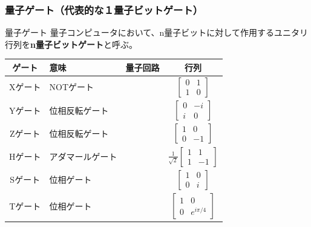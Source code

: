 \documentclass[9pt]{beamer}
\begin{document}
\begin{frame}
  \frametitle{量子ゲート（代表的な１量子ビットゲート）}
  \begin{block}{量子ゲート}
      量子コンピュータにおいて、n量子ビットに対して作用するユニタリ行列を\textbf{n量子ビットゲート}と呼ぶ。
  \end{block}
  \begin{table}[]
    \centering
    \footnotesize
    \begin{tabular}{|c|>{\centering\arraybackslash}p{5em}|c|c|} \hline
      ゲート & 意味 & 量子回路 & 行列 \\ \hline
      Xゲート & NOTゲート & \hspace{5em} \rule{0pt}{2em} & $\begin{bmatrix}0 & 1 \\ 1 & 0\end{bmatrix}$ \\ \hline
      Yゲート & 位相反転ゲート & \hspace{5em} \rule{0pt}{2em} & $\begin{bmatrix}0 & -i \\ i & 0\end{bmatrix}$ \\ \hline
      Zゲート & 位相反転ゲート & \hspace{5em} \rule{0pt}{2em} & $\begin{bmatrix}1 & 0 \\ 0 & -1\end{bmatrix}$ \\ \hline
      Hゲート & アダマールゲート & \hspace{5em} \rule{0pt}{2em} & $\frac{1}{\sqrt{2}} \begin{bmatrix}1 & 1 \\ 1 & -1\end{bmatrix}$ \\ \hline
      Sゲート & 位相ゲート & \hspace{5em} \rule{0pt}{2em} & $\begin{bmatrix}1 & 0 \\ 0 & i\end{bmatrix}$ \\ \hline
      Tゲート & 位相ゲート & \hspace{5em} \rule{0pt}{2em} & $\begin{bmatrix}1 & 0 \\ 0 & e^{i\pi/4}\end{bmatrix}$ \\ \hline
    \end{tabular}
  \end{table}
\end{frame}
\end{document}
